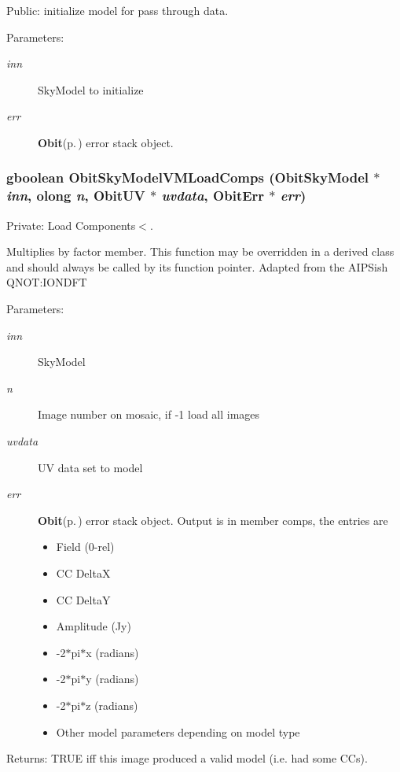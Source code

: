 Public: initialize model for pass through data. 

\begin{Desc}
\item[Parameters:]
\begin{description}
\item[{\em inn}]Sky\-Model to initialize \item[{\em err}]{\bf Obit}{\rm (p.\,\pageref{structObit})} error stack object. \end{description}
\end{Desc}
\subsubsection{\setlength{\rightskip}{0pt plus 5cm}gboolean Obit\-Sky\-Model\-VMLoad\-Comps ({\bf Obit\-Sky\-Model} $\ast$ {\em inn}, {\bf olong} {\em n}, {\bf Obit\-UV} $\ast$ {\em uvdata}, {\bf Obit\-Err} $\ast$ {\em err})}\label{ObitSkyModelVM_8c_a11}


Private: Load Components$<$. 

Multiplies by factor member. This function may be overridden in a derived class and should always be called by its function pointer. Adapted from the AIPSish QNOT:IONDFT \begin{Desc}
\item[Parameters:]
\begin{description}
\item[{\em inn}]Sky\-Model \item[{\em n}]Image number on mosaic, if -1 load all images \item[{\em uvdata}]UV data set to model \item[{\em err}]{\bf Obit}{\rm (p.\,\pageref{structObit})} error stack object. Output is in member comps, the entries are \begin{itemize}
\item Field (0-rel) \item CC Delta\-X \item CC Delta\-Y \item Amplitude (Jy) \item -2$\ast$pi$\ast$x (radians) \item -2$\ast$pi$\ast$y (radians) \item -2$\ast$pi$\ast$z (radians) \item Other model parameters depending on model type \end{itemize}
\end{description}
\end{Desc}
\begin{Desc}
\item[Returns:]TRUE iff this image produced a valid model (i.e. had some CCs). \end{Desc}
